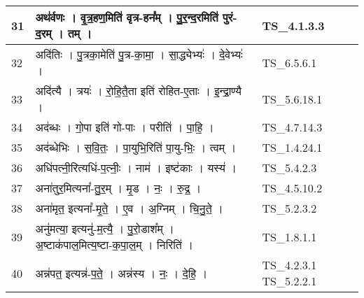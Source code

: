 \documentclass[17pt]{extarticle}
\begin{document}
\begin{longtable}{||p{0.4in}||p{4.9in}||p{0.9in}||}
    \hline
        
    31 & अथ॑र्वणः   ।   वृ॒त्र॒हण॒मिति॑ वृत्र{-}हन᳚म्   ।   पु॒र॒न्द॒रमिति॑ पुरं{-}द॒रम्   ।   तम्   ।    & TS\_4.1.3.3       \\
    
    \hline
        
    32 & अदि॑तिः   ।   पु॒त्रका॒मेति॑ पु॒त्र{-}का॒मा॒   ।   सा॒द्ध्येभ्यः॑   ।   दे॒वेभ्यः॑   ।    & TS\_6.5.6.1       \\
    
    \hline
        
    33 & अदि॑त्यै   ।   त्रयः॑   ।   रो॒हि॒तै॒ता इति॑ रोहित{-}ए॒ताः   ।   इ॒न्द्रा॒ण्यै   ।    & TS\_5.6.18.1       \\
    
    \hline
        
    34 & अद॑ब्धः   ।   गो॒पा इति॑ गो{-}पाः   ।   परीति॑   ।   पा॒हि॒   ।    & TS\_4.7.14.3       \\
    
    \hline
        
    35 & अद॑ब्धेभिः   ।   स॒वि॒तः॒   ।   पा॒युभि॒रिति॑ पा॒यु{-}भिः॒   ।   त्वम्   ।    & TS\_1.4.24.1       \\
    
    \hline
        
    36 & अधि॑पत्नी॒रित्यधि॑{-}प॒त्नीः॒   ।   नाम॑   ।   इष्ट॑काः   ।   यस्य॑   ।    & TS\_5.4.2.3       \\
    
    \hline
        
    37 & अना॑तुर॒मित्यना᳚{-}तु॒र॒म्   ।   मृ॒ड   ।   नः॒   ।   रु॒द्र॒   ।    & TS\_4.5.10.2       \\
    
    \hline
        
    38 & अना॑मृत॒ इत्यना᳚{-}मृ॒ते॒   ।   ए॒व   ।   अ॒ग्निम्   ।   चि॒नु॒ते॒   ।    & TS\_5.2.3.2       \\
    
    \hline
        
    39 & अनु॑मत्या॒ इत्यनु॑{-}म॒त्यै॒   ।   पु॒रो॒डाश᳚म्   ।   अ॒ष्टाक॑पाल॒मित्य॒ष्टा{-}क॒पा॒ल॒म्   ।   निरिति॑   ।    & TS\_1.8.1.1       \\
    
    \hline
        
    40 & अन्न॑पत॒ इत्यन्न॑{-}प॒ते॒   ।   अन्न॑स्य   ।   नः॒   ।   दे॒हि॒   ।    & TS\_4.2.3.1 TS\_5.2.2.1       \\
    

\end{longtable}
\end{document}
